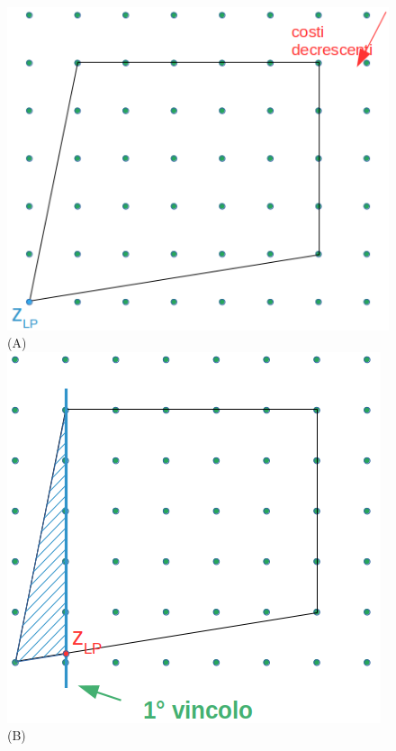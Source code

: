 \begin{figure}[!htb]
	\includegraphics[width=\linewidth]{images/graph9.png} 
	(A)
	\label{fig:pianiditaglio1}
	\endminipage\hfill
	\includegraphics[width=\linewidth]{images/graph10.png}
	(B)
	\label{fig:pianiditaglio2}
	\endminipage\hfill

\end{figure}
